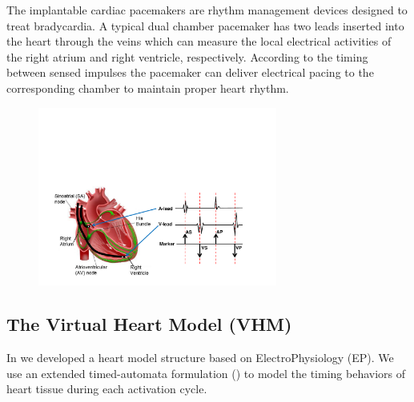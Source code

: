 The implantable cardiac pacemakers are rhythm management devices designed to treat bradycardia. A typical dual chamber pacemaker has two leads inserted into the heart through the veins which can measure the local electrical activities of the right atrium and right ventricle, respectively. According to the timing between sensed impulses the pacemaker can deliver electrical pacing to the corresponding chamber to maintain proper heart rhythm.
\begin{figure}[!t]
\centering
		\includegraphics[width=0.7\textwidth]{figs/egm.pdf}
		
\caption{\small }
\label{fig:probes}
\end{figure} 
\subsection{The Virtual Heart Model (VHM)}
In \cite{VHM_proc} we developed a heart model structure based on ElectroPhysiology (EP). We use an extended timed-automata formulation (\cite{timed_automata}) to model the timing behaviors of heart tissue during each activation cycle. 

